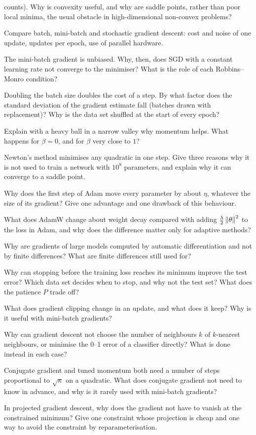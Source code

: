 \documentclass[11pt]{article}
\begin{document}
\begin{questions}
\begin{conceptual}
counts). Why is convexity useful, and why are
saddle points, rather than poor local minima, the usual obstacle in high-dimensional non-convex problems?
\item Compare batch, mini-batch and stochastic gradient descent: cost and noise of one update, updates per epoch,
use of parallel hardware.
\item The mini-batch gradient is unbiased. Why, then, does SGD with a constant learning rate not converge to the
minimiser? What is the role of each Robbins--Monro condition?
\item Doubling the batch size doubles the cost of a step. By what factor does the standard deviation of the gradient
estimate fall (batches drawn with replacement)? Why is the data set shuffled at the start of every epoch?
\item Explain with a heavy ball in a narrow valley why momentum helps. What happens for $\beta = 0$, and for $\beta$
very close to $1$?
\item Newton's method minimises any quadratic in one step. Give three reasons why it is not used to train a network
with $10^8$ parameters, and explain why it can converge to a saddle point.
\item Why does the first step of Adam move every parameter by about $\eta$, whatever the size of its gradient? Give one
advantage and one drawback of this behaviour.
\item What does AdamW change about weight decay compared with adding $\frac\lambda2\left\lVert \theta \right\rVert^2$ to the loss in
Adam, and why does the difference matter only for adaptive methods?
\item Why are gradients of large models computed by automatic differentiation and not by finite differences? What are
finite differences still used for?
\item Why can stopping before the training loss reaches its minimum improve the test error? Which data set decides
when to stop, and why not the test set? What does the patience $P$ trade off?
\item What does gradient clipping change in an update, and what does it keep? Why is it useful with mini-batch
gradients?
\item Why can gradient descent not choose the number of neighbours $k$ of $k$-nearest neighbours, or minimise the 0--1
error of a classifier directly? What is done instead in each case?
\item Conjugate gradient and tuned momentum both need a number of steps proportional to $\sqrt\kappa$ on a quadratic.
What does conjugate gradient not need to know in advance, and why is it rarely used with mini-batch gradients?
\item In projected gradient descent, why does the gradient not have to vanish at the constrained minimum? Give one constraint
whose projection is cheap and one way to avoid the constraint by reparameterisation.
\end{conceptual}


\end{questions}
\end{document}
